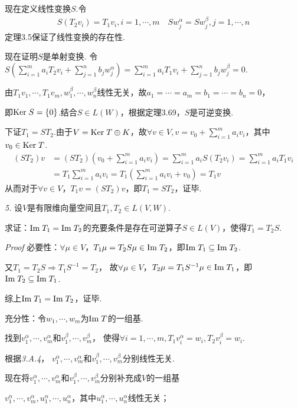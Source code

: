 现在定义线性变换\(S\).令
    \begin{align*}
        S(T_2v_i)=T_1v_i,i=1,\cdots,m \quad Sw_j^\alpha=Sw_j^\beta,j=1,\cdots,n
    \end{align*}
定理3.5保证了线性变换的存在性.

现在证明\(S\)是单射变换.
令\(S(\sum_{i=1}^m a_iT_2v_i+\sum_{j=1}^n b_jw_j^\alpha)=\sum_{i=1}^m a_iT_1v_i+\sum_{j=1}^n b_jw_j^\beta=0\).

由\(T_1v_1,\cdots,T_1v_m,w_1^\beta,\cdots,w_n^\beta\)线性无关，故\(a_1=\cdots=a_m=b_1=\cdots=b_n=0\)，

即\(\mathrm{Ker \;} S=\{0\}\).结合\(S \in L(W)\)，根据定理3.69，\(S\)是可逆变换.

下证\(T_1=ST_2\).由于\(V=\mathrm{Ker \;} T \oplus K\)，故\(\forall v \in V,v=v_0+\sum_{i=1}^m a_iv_i\)，其中\(v_0 \in \mathrm{Ker \;} T\).
    \begin{align*}
        (ST_2)v&=(ST_2)(v_0+\sum_{i=1}^m a_iv_i)=\sum_{i=1}^m a_iS(T_2v_i)=\sum_{i=1}^m a_iT_1v_i \\
            &=T_1\sum_{i=1}^m a_iv_i=T_1(\sum_{i=1}^m a_iv_i+v_0)=T_1v
    \end{align*}
从而对于\(\forall v \in V\)，\(T_1v=(ST_2)v\)，即\(T_1=ST_2\)，证毕.

\newpage

\textit{5.}
设\(V\)是有限维向量空间且\(T_1,T_2 \in L(V,W)\).

求证：\(\mathrm{Im \;} T_1=\mathrm{Im \;} T_2\)的充要条件是存在可逆算子\(S \in L(V)\)，使得\(T_1=T_2S\).

\textit{Proof}
必要性：\(\forall \mu \in V\)，\(T_1 \mu =T_2S \mu \in \mathrm{Im \;} T_2\)，即\(\mathrm{Im \;} T_1 \subseteq \mathrm{Im \;} T_2\).

又\(T_1=T_2S \Rightarrow T_1S^{-1}=T_2\)，
故\(\forall \mu \in V\)，\(T_2 \mu =T_1S^{-1} \mu \in \mathrm{Im \;} T_1\)，即\(\mathrm{Im \;} T_2 \subseteq \mathrm{Im \;} T_1\).

综上\(\mathrm{Im \;} T_1=\mathrm{Im \;} T_2\)，证毕.

充分性：令\(w_1,\cdots,w_m\)为\(\mathrm{Im \;} T\)的一组基.

找到\(v_1^\alpha,\cdots,v_m^\alpha\)和\(v_1^\beta,\cdots,v_m^\beta\)，
使得\(\forall i=1,\cdots,m,T_1v_i^\alpha=w_i,T_2v_i^\beta=w_i\).

根据\textit{3.A.4}，
\(v_1^\alpha,\cdots,v_m^\alpha\)和\(v_1^\beta,\cdots,v_m^\beta\)分别线性无关.

现在将\(v_1^\alpha,\cdots,v_m^\alpha\)和\(v_1^\beta,\cdots,v_m^\beta\)分别补充成\(V\)的一组基

\(v_1^\alpha,\cdots,v_m^\alpha,u_1^\alpha,\cdots,u_n^\alpha\)，其中\(u_1^\alpha,\cdots,u_n^\alpha\)线性无关；


